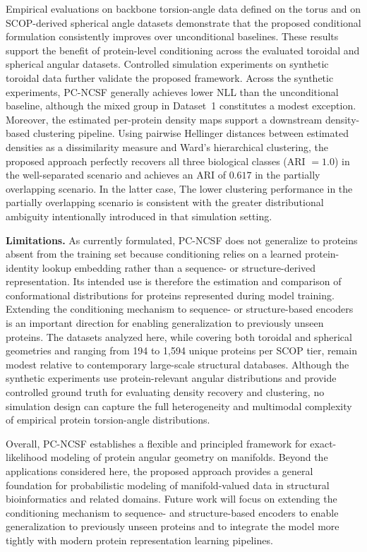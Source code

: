 \documentclass{article}
\begin{document}
Empirical evaluations on backbone torsion-angle data defined on the torus and on SCOP-derived spherical angle datasets demonstrate that the proposed conditional formulation consistently improves over unconditional baselines. {\color{red} These results support the benefit of protein-level conditioning across the evaluated toroidal and spherical angular datasets.} Controlled simulation experiments on synthetic toroidal data further validate the proposed framework. {\color{red}
Across the synthetic experiments, PC-NCSF generally achieves lower NLL
than the unconditional baseline, although the mixed group in Dataset~1
constitutes a modest exception.} Moreover, the estimated per-protein density maps support a downstream density-based clustering pipeline. Using pairwise Hellinger distances between estimated densities as a dissimilarity measure and Ward's hierarchical clustering, the proposed approach perfectly recovers all three biological classes (ARI $= 1.0$) in the well-separated scenario and achieves an ARI of $0.617$ in the partially overlapping scenario. In the latter case, {\color{red}The lower clustering performance in the partially overlapping scenario is consistent with the greater distributional ambiguity intentionally introduced
in that simulation setting.}

{\color{red}
\textbf{Limitations.} As currently formulated, PC-NCSF does not generalize to proteins absent from
the training set because conditioning relies on a learned protein-identity
lookup embedding rather than a sequence- or structure-derived representation.
Its intended use is therefore the estimation and comparison of conformational
distributions for proteins represented during model training. Extending the
conditioning mechanism to sequence- or structure-based encoders is an
important direction for enabling generalization to previously unseen proteins.
The datasets analyzed here, while covering both toroidal and spherical
geometries and ranging from 194 to 1,594 unique proteins per SCOP tier,
remain modest relative to contemporary large-scale structural databases.
Although the synthetic experiments use protein-relevant angular distributions
and provide controlled ground truth for evaluating density recovery and
clustering, no simulation design can capture the full heterogeneity and
multimodal complexity of empirical protein torsion-angle distributions.
}

Overall, PC-NCSF establishes a flexible and principled framework for exact-likelihood modeling of protein angular geometry on manifolds. Beyond the applications considered here, the proposed approach provides a general foundation for probabilistic modeling of manifold-valued data in structural bioinformatics and related domains. Future work will focus on extending the conditioning mechanism to sequence- and structure-based encoders to enable generalization to previously unseen proteins and to integrate the model more tightly with modern protein representation learning pipelines.
\end{document}
